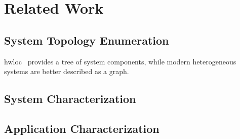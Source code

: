 \chapter{Related Work}

\section{System Topology Enumeration}

hwloc~\cite{broquedis2010hwloc} provides a tree of system components, while modern heterogeneous systems are better described as a graph.

\section{System Characterization}


\section{Application Characterization}

